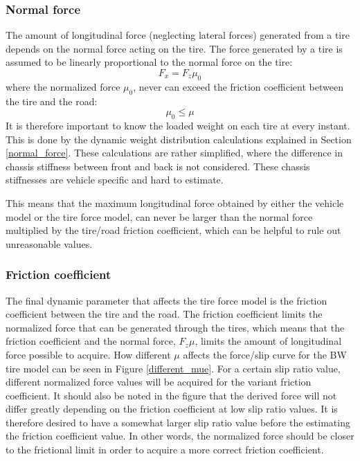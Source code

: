 \subsubsection{Normal force}
The amount of longitudinal force (neglecting lateral forces) generated from a tire depends on the normal force acting on the tire. The force generated by a tire is assumed to be linearly proportional to the normal force on the tire:
\begin{equation}
	F_{x} = F_{z}\mu_{0}
\end{equation}
where the normalized force $ \mu_{0} $, never can exceed the friction coefficient between the tire and the road:
\begin{equation}
	\mu_{0} \leq \mu
\end{equation}
It is therefore important to know the loaded weight on each tire at every instant. This is done by the dynamic weight distribution calculations explained in Section \ref{normal_force}. These calculations are rather simplified, where the difference in chassis stiffness between front and back is not considered. These chassis stiffnesses are vehicle specific and hard to estimate. 

This means that the maximum longitudinal force obtained by either the vehicle model or the tire force model, can never be larger than the normal force multiplied by the tire/road friction coefficient, which can be helpful to rule out unreasonable values. 

\subsubsection{Friction coefficient}
\label{section_friction coefficient}
The final dynamic parameter that affects the tire force model is the friction coefficient between the tire and the road. The friction coefficient limits the normalized force that can be generated through the tires, which means that the friction coefficient and the normal force, $ F_{z}\mu $, limits the amount of longitudinal force possible to acquire. How different $ \mu $ affects the force/slip curve for the BW tire model can be seen in Figure \ref{different_mue}. For a certain slip ratio value, different normalized force values will be acquired for the variant friction coefficient. It should also be noted in the figure that the derived force will not differ greatly depending on the friction coefficient at low slip ratio values. It is therefore desired to have a somewhat larger slip ratio value before the estimating the friction coefficient value. In other words, the normalized force should be closer to the frictional limit in order to acquire a more correct friction coefficient. 

